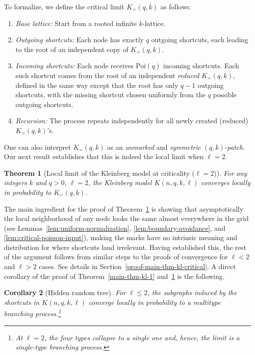 \documentclass[10pt]{amsart}
\newtheorem{theorem}{Theorem}[section]
\newtheorem{corollary}[theorem]{Corollary}
\begin{document}
To formalize, we define the critical limit $K_{=}(q,k)$ as follows:
\begin{enumerate}
    \item \textit{Base lattice:} Start from a rooted infinite
    $k$-lattice.
    \item \textit{Outgoing shortcuts:} Each node has exactly $q$
    outgoing shortcuts, each leading to the root of an independent copy
    of $K_{=}(q,k)$.
    \item \textit{Incoming shortcuts:} Each node receives
    $\mathrm{Poi}(q)$ incoming shortcuts. Each such shortcut
    comes from the root of an independent \textit{reduced} $K_{=}(q,k)$, defined
    in the same way except that the root has only $q-1$ outgoing
    shortcuts, with the missing shortcut chosen uniformly from the $q$
    possible outgoing shortcuts.

    \item \textit{Recursion:} The process repeats independently for all newly created (reduced) $K_{=}(q,k)$'s.

\end{enumerate}
One can also interpret $K_{=}(q,k)$ as an \textit{unmarked} and \textit{symmetric} $(q, k)$-\textit{patch}. Our next result establishes that this is indeed the local limit when $\ell=2$.

\begin{theorem}[Local limit of the Kleinberg model at criticality ($\ell = 2$)] \label{main-thm-kl-critical} For any integers $k$ and $q>0$, $\ell = 2$, the Kleinberg model $K(n,q,k,\ell)$ converges locally in  probability to  $K_{=}(q,k)$.
\end{theorem}




The main ingredient for the proof of Theorem~\ref{main-thm-kl-critical} is showing that asymptotically the local neighborhood of any node looks the same almost everywhere in the grid (see Lemmas~\ref{lem:uniform-normalization}, \ref{lem:boundary-avoidance}, and \ref{lem:critical-poisson-input}), making the marks have no intrinsic meaning and distribution for where shortcuts land irrelevant. Having established this, the rest of the argument follows from similar steps to the proofs of convergence for $\ell < 2$ and $\ell > 2$ cases. See details in Section~\ref{proof-main-thm-kl-critical}. 
A direct corollary of the proof of Theorem~\ref{main-thm-kl-1} and~\ref{main-thm-kl-critical} is the following.
\begin{corollary}[Hidden random tree] \label{hidden-tree}
For $\ell \leq 2$, the subgraphs induced by the shortcuts in
$K(n,q,k,\ell)$ converge locally in probability to a multitype branching
process.\footnote{At $\ell=2$, the four types collapse to a single one and, hence, the limit is a single-type branching process.}
\end{corollary}
\end{document}
